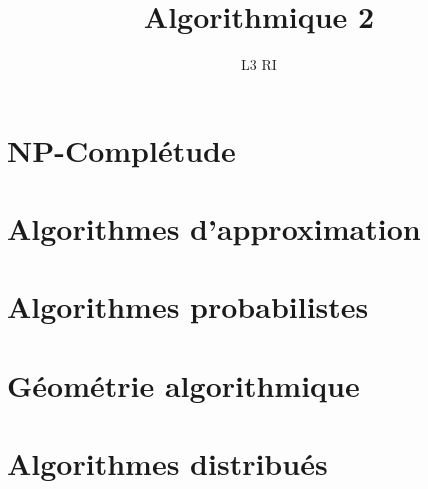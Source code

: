 \documentclass[french]{article}
\title{Algorithmique 2}
\date{}
\author{L3 RI}
\begin{document}
\maketitle
\tableofcontents

\section{NP-Complétude}

\section{Algorithmes d'approximation}

\section{Algorithmes probabilistes}

\section{Géométrie algorithmique}

\section{Algorithmes distribués}
\end{document}
